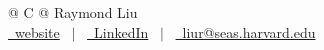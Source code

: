 \documentclass[letterpaper,11pt]{article}
\begin{document}
\pagestyle{empty} 


\begin{tabularx}{\linewidth}{@{} C @{}}
\Huge{Raymond Liu} \\[7.5pt]
\href{https://rl27.github.io}{\raisebox{-0.05\height}\faLink \ website} \ $|$ \ 
\href{https://linkedin.com/in/raymondzl}{\raisebox{-0.05\height}\faLinkedin\ LinkedIn} \ $|$ \ 
\href{mailto:liur@seas.harvard.edu}{\raisebox{-0.05\height}\faEnvelope \ liur@seas.harvard.edu} \
\end{tabularx}

\end{document}
